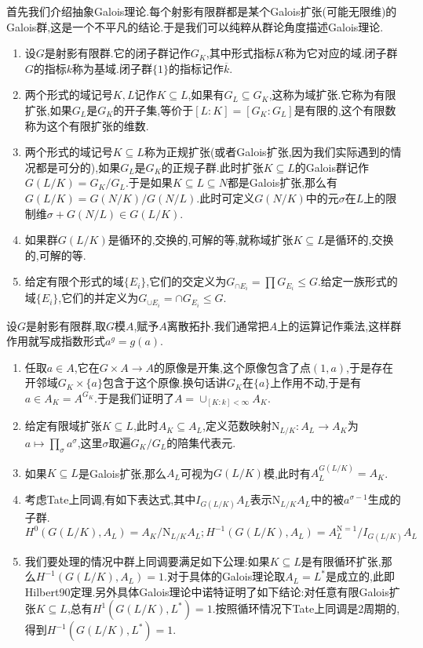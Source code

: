 首先我们介绍抽象Galois理论.每个射影有限群都是某个Galois扩张(可能无限维)的Galois群,这是一个不平凡的结论.于是我们可以纯粹从群论角度描述Galois理论.
\begin{enumerate}
	\item 设$G$是射影有限群.它的闭子群记作$G_K$,其中形式指标$K$称为它对应的域.闭子群$G$的指标$k$称为基域.闭子群$\{1\}$的指标记作$\overline{k}$.
	\item 两个形式的域记号$K,L$记作$K\subseteq L$,如果有$G_L\subseteq G_K$,这称为域扩张.它称为有限扩张,如果$G_L$是$G_K$的开子集,等价于$[L:K]=[G_K:G_L]$是有限的,这个有限数称为这个有限扩张的维数.
	\item 两个形式的域记号$K\subseteq L$称为正规扩张(或者Galois扩张,因为我们实际遇到的情况都是可分的),如果$G_L$是$G_K$的正规子群.此时扩张$K\subseteq L$的Galois群记作$G(L/K)=G_K/G_L$.于是如果$K\subseteq L\subseteq N$都是Galois扩张,那么有$G(L/K)=G(N/K)/G(N/L)$.此时可定义$G(N/K)$中的元$\sigma$在$L$上的限制维$\sigma+G(N/L)\in G(L/K)$.
	\item 如果群$G(L/K)$是循环的,交换的,可解的等,就称域扩张$K\subseteq L$是循环的,交换的,可解的等.
	\item 给定有限个形式的域$\{E_i\}$,它们的交定义为$G_{\cap E_i}=\prod G_{E_i}\le G$.给定一族形式的域$\{E_i\}$,它们的并定义为$G_{\cup E_i}=\cap G_{E_i}\le G$.
\end{enumerate}

设$G$是射影有限群,取$G$模$A$,赋予$A$离散拓扑.我们通常把$A$上的运算记作乘法,这样群作用就写成指数形式$a^g=g(a)$.
\begin{enumerate}
	\item 任取$a\in A$,它在$G\times A\to A$的原像是开集,这个原像包含了点$(1,a)$,于是存在开邻域$G_K\times\{a\}$包含于这个原像.换句话讲$G_K$在$\{a\}$上作用不动,于是有$a\in A_K=A^{G_K}$.于是我们证明了$A=\cup_{[K:k]<\infty}A_K$.
	\item 给定有限域扩张$K\subseteq L$,此时$A_K\subseteq A_L$,定义范数映射$\mathrm{N}_{L/K}:A_L\to A_K$为$a\mapsto\prod_{\sigma}a^{\sigma}$,这里$\sigma$取遍$G_K/G_L$的陪集代表元.
	\item 如果$K\subseteq L$是Galois扩张,那么$A_L$可视为$G(L/K)$模,此时有$A_L^{G(L/K)}=A_K$.
	\item 考虑Tate上同调,有如下表达式,其中$I_{G(L/K)}A_L$表示$\mathrm{N}_{L/K}A_L$中的被$a^{\sigma-1}$生成的子群.
	$$H^0(G(L/K),A_L)=A_K/\mathrm{N}_{L/K}A_L;H^{-1}(G(L/K),A_L)=A_L^{\mathrm{N}=1}/I_{G(L/K)}A_L$$
	\item 我们要处理的情况中群上同调要满足如下公理:如果$K\subseteq L$是有限循环扩张,那么$H^{-1}(G(L/K),A_L)=1$.对于具体的Galois理论取$A_L=L^*$是成立的,此即Hilbert90定理.另外具体Galois理论中诺特证明了如下结论:对任意有限Galois扩张$K\subseteq L$,总有$H^1(G(L/K),L^*)=1$.按照循环情况下Tate上同调是2周期的,得到$H^{-1}(G(L/K),L^*)=1$.
	
\end{enumerate}

